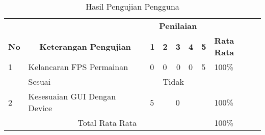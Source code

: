 \begin{table}[h]
    \centering
    \caption{Hasil Pengujian Pengguna}
    \label{tab:pengujian-hasil}
    \begin{tabular}{|lllllll|l|}
    \hline
    \multicolumn{1}{|l|}{}                              & \multicolumn{1}{c|}{}                                                & \multicolumn{5}{c|}{\textbf{Penilaian}}                                                                                                                                 &                                      \\ \cline{3-7}
    \multicolumn{1}{|l|}{\multirow{-2}{*}{\textbf{No}}} & \multicolumn{1}{c|}{\multirow{-2}{*}{\textbf{Keterangan Pengujian}}} & \multicolumn{1}{c|}{\textbf{1}} & \multicolumn{1}{c|}{\textbf{2}} & \multicolumn{1}{c|}{\textbf{3}} & \multicolumn{1}{c|}{\textbf{4}} & \multicolumn{1}{c|}{\textbf{5}} & \multirow{-2}{*}{\textbf{Rata Rata}} \\ \hline
    \multicolumn{1}{|l|}{1}                             & \multicolumn{1}{l|}{Kelancaran FPS Permainan}                        & \multicolumn{1}{l|}{0}          & \multicolumn{1}{l|}{0}          & \multicolumn{1}{r|}{0}          & \multicolumn{1}{l|}{0}          & 5                               & 100\%                                \\ \hline
    \rowcolor[HTML]{9B9B9B} 
    \multicolumn{2}{|l|}{\cellcolor[HTML]{9B9B9B}}                                                                             & \multicolumn{2}{l|}{\cellcolor[HTML]{9B9B9B}Sesuai}               & \multicolumn{3}{l|}{\cellcolor[HTML]{9B9B9B}Tidak}                                                  &                                      \\ \hline
    \multicolumn{1}{|l|}{2}                             & \multicolumn{1}{l|}{Kesesuaian GUI Dengan Device}                    & \multicolumn{2}{l|}{5}                                            & \multicolumn{3}{l|}{0}                                                                              & 100\%                                \\ \hline
    \multicolumn{7}{|c|}{Total Rata Rata}                                                                                                                                                                                                                                                                & 100\%                                \\ \hline
    \end{tabular}
    \end{table}

